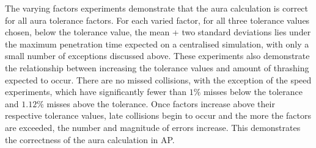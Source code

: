 The varying factors experiments demonstrate that the aura calculation is correct for all aura tolerance factors. For each varied factor, for all three tolerance values chosen, below the tolerance value, the mean + two standard deviations lies under the maximum penetration time expected on a centralised simulation, with only a small number of exceptions discussed above. These experiments also demonstrate the relationship between increasing the tolerance values and amount of thrashing expected to occur. There are no missed collisions, with the exception of the speed experiments, which have significantly fewer than $1\%$ misses below the tolerance and $1.12\%$ misses above the tolerance. Once factors increase above their respective tolerance values, late collisions begin to occur and the more the factors are exceeded, the number and magnitude of errors increase. This demonstrates the correctness of the aura calculation in AP.







